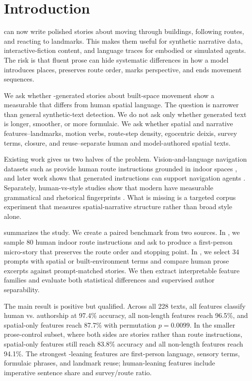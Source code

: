 \section{Introduction}
\label{sec:introduction}

\llms can now write polished stories about moving through buildings, following routes, and reacting to landmarks. This makes them useful for synthetic narrative data, interactive-fiction content, and language traces for embodied or simulated agents. The risk is that fluent prose can hide systematic differences in how a model introduces places, preserves route order, marks perspective, and ends movement sequences.

We ask whether \llm-generated stories about built-space movement show a measurable \spatialgrammar that differs from human spatial language. The question is narrower than general synthetic-text detection. We do not ask only whether generated text is longer, smoother, or more formulaic. We ask whether spatial and narrative features--landmarks, motion verbs, route-step density, egocentric deixis, survey terms, closure, and reuse--separate human and model-authored spatial texts.

Existing work gives us two halves of the problem. Vision-and-language navigation datasets such as \rtr provide human route instructions grounded in indoor spaces \cite{anderson2018vision}, and later work shows that generated instructions can support navigation agents \cite{fried2018speaker}. Separately, human-vs-\llm style studies show that modern \llms have measurable grammatical and rhetorical fingerprints \cite{reinhart2025llms}. What is missing is a targeted corpus experiment that measures spatial-narrative structure rather than broad style alone.



 summarizes the study. We create a paired benchmark from two sources. In \rtr, we sample 80 human indoor route instructions and ask \gptmini to produce a first-person micro-story that preserves the route order and stopping point. In \writingprompts, we select 34 prompts with spatial or built-environment terms and compare human prose excerpts against prompt-matched \gptmini stories. We then extract interpretable feature families and evaluate both statistical differences and supervised author separability.

The main result is positive but qualified. Across all 228 texts, all features classify human vs. \llm authorship at 97.4\% accuracy, all non-length features reach 96.5\%, and spatial-only features reach 87.7\% with permutation $p=0.0099$. In the smaller prose-control subset, where both sides are stories rather than route instructions, spatial-only features still reach 83.8\% accuracy and all non-length features reach 94.1\%. The strongest \llm-leaning features are first-person language, sensory terms, formulaic phrases, and landmark reuse; human-leaning features include imperative sentence share and survey/route ratio.

